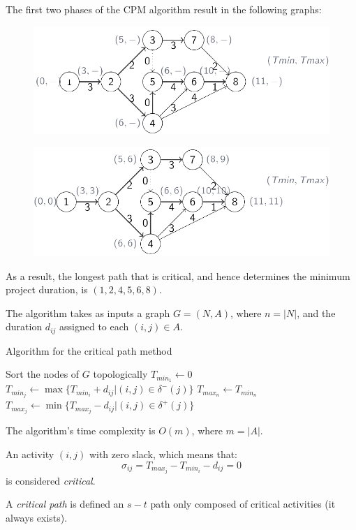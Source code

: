 \documentclass[12pt, a4paper]{report}
\begin{document}
\begin{example}
        The first two phases of the CPM algorithm result in the following graphs:
        \begin{figure}[H]
            \centering
            \includegraphics[width=0.75\linewidth]{images/aproject.png}
        \end{figure}
        \begin{figure}[H]
            \centering
            \includegraphics[width=0.75\linewidth]{images/aproject1.png}
        \end{figure}
        As a result, the longest path that is critical, and hence determines the minimum project duration, is $(1,2,4,5,6,8)$.
    \end{example}
    The algorithm takes as inputs a graph $G = (N,A)$, where $n= \left\lvert N \right\rvert $, and the duration $d_{ij}$ assigned to each $(i,j) \in A$. 
    \begin{algorithm}[H]
        \caption{Algorithm for the critical path method}
            \begin{algorithmic}[1]
                \State Sort the nodes of $G$ topologically
                \State $T_{min_1} \leftarrow 0$
                    \State $T_{min_j} \leftarrow \max\{T_{min_i}+d_{ij}|(i,j) \in \delta^{-}(j)\}$
                \EndFor
                \State $T_{max_n} \leftarrow T_{min_n}$
                \State $T_{max_j} \leftarrow \min\{T_{max_j}-d_{ij}|(i,j) \in \delta^{+}(j)\}$
                \EndFor
            \end{algorithmic}
    \end{algorithm}
    The algorithm's time complexity is $O(m)$, where $m =\left\lvert A\right\rvert$. 
    \begin{definition}
        An activity $(i,j)$ with zero slack, which means that:
        \[\sigma_{ij}=T_{max_j}-T_{min_i}-d_{ij}=0\]
        is considered \emph{critical}. 

        A \emph{critical path} is defined an $s-t$ path only composed of critical activities (it always exists).
    \end{definition}
\end{document}

